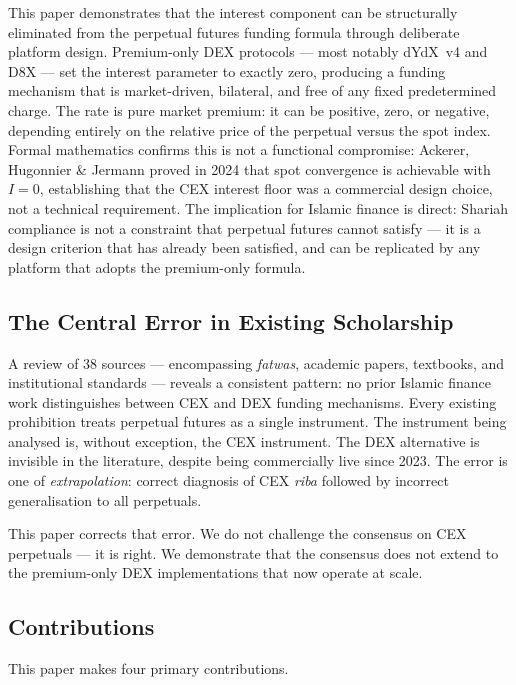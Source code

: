 \documentclass[10pt,twocolumn]{article}
\begin{document}
This paper demonstrates that the interest component can be structurally
eliminated from the perpetual futures funding formula through deliberate
platform design. Premium-only DEX protocols --- most notably dYdX~v4 and D8X
--- set the interest parameter to exactly zero, producing a funding mechanism
that is market-driven, bilateral, and free of any fixed predetermined charge.
The rate is pure market premium: it can be positive, zero, or negative,
depending entirely on the relative price of the perpetual versus the spot index.
Formal mathematics confirms this is not a functional compromise: Ackerer,
Hugonnier \& Jermann \cite{Ackerer2024} proved in 2024 that spot convergence is
achievable with $I = 0$, establishing that the CEX interest floor was a
commercial design choice, not a technical requirement. The implication for
Islamic finance is direct: Shariah compliance is not a constraint that perpetual
futures cannot satisfy --- it is a design criterion that has already been
satisfied, and can be replicated by any platform that adopts the premium-only
formula.

\subsection*{The Central Error in Existing Scholarship}

A review of 38 sources --- encompassing \textit{fatwas}, academic papers,
textbooks, and institutional standards --- reveals a consistent pattern: no
prior Islamic finance work distinguishes between CEX and DEX funding mechanisms.
Every existing prohibition treats perpetual futures as a single instrument.
The instrument being analysed is, without exception, the CEX instrument. The
DEX alternative is invisible in the literature, despite being commercially live
since 2023. The error is one of \emph{extrapolation}: correct diagnosis of CEX
\textit{riba} followed by incorrect generalisation to all perpetuals.

This paper corrects that error. We do not challenge the consensus on CEX
perpetuals --- it is right. We demonstrate that the consensus does not extend
to the premium-only DEX implementations that now operate at scale.

\subsection*{Contributions}

This paper makes four primary contributions.
\end{document}
